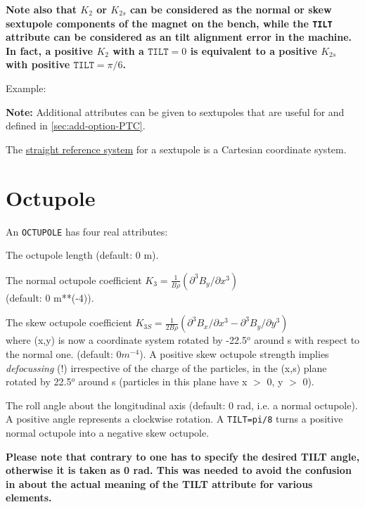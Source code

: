 \textbf{Note also that $K_2$ or $K_{2s}$ can be considered as the normal
  or skew sextupole components of the magnet on the bench, while the
  \texttt{TILT} attribute can be considered as an tilt alignment error in the
  machine. In fact, a positive $K_2$ with a $\mathtt{TILT} = 0$ is equivalent to a
  positive $K_{2s}$ with positive $\mathtt{TILT} = \pi/6$.} 

Example: 

\textbf{Note:} Additional attributes can be given to sextupoles that
are useful for \ptc and defined in \ref{sec:add-option-PTC}.

The \hyperref[subsec:local-straight]{straight reference system} for a
sextupole is a Cartesian coordinate system.   


\section{Octupole}
\label{sec:octupole}


An \texttt{OCTUPOLE} has four real attributes: 
\begin{madlist}
    The octupole length (default: 0 m). 

    The normal octupole coefficient 
     $K_3 = \frac{1}{B \rho} (\partial^3B_y / \partial x^3)$ \\ 
     (default: 0 m**(-4)). 

    The skew octupole coefficient 
     $K_{3S} = \frac{1}{2 B\rho} (\partial^3B_x/\partial x^3 -
   \partial^3B_y/\partial y^3)$ \\
     where (x,y) is now a coordinate system rotated by -22.5$^o$ around
     s with respect to the normal one. (default: $0 m^{-4}$). A positive
     skew octupole strength implies \textsl{defocussing} (!) 
     irrespective of the charge of the particles,
     in the (x,s) plane rotated by 22.5$^o$ around s
     (particles in this plane have x $>$ 0, y $>$ 0).  

    The roll angle about the longitudinal axis (default: 0
     rad, i.e. a normal octupole). A positive angle represents a
     clockwise rotation. A \texttt{TILT=pi/8} turns a positive normal octupole
     into a negative skew octupole.  

     \textbf{Please note that contrary to \madeight one has to specify the
       desired TILT angle, otherwise it is taken as 0 rad. This was
       needed to avoid the confusion in \madeight about the actual meaning of
       the TILT attribute for various elements. }

\end{madlist}

